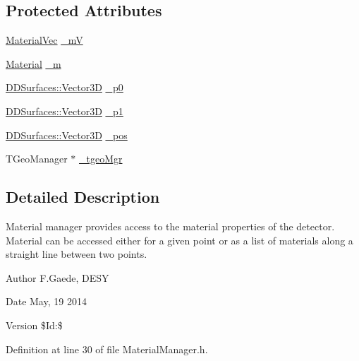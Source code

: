 \subsection*{Protected Attributes}
\begin{DoxyCompactItemize}
\item 
\hyperlink{namespace_d_d4hep_1_1_d_d_rec_a69fdab2f851316d2b9e50956920359f7}{Material\+Vec} \hyperlink{class_d_d4hep_1_1_d_d_rec_1_1_material_manager_ad0ce589d4286c2392a208ec8a09455e4}{\+\_\+mV}
\item 
\hyperlink{class_d_d4hep_1_1_geometry_1_1_material}{Material} \hyperlink{class_d_d4hep_1_1_d_d_rec_1_1_material_manager_a9959722f6a2058c3058c1bc06660f8f1}{\+\_\+m}
\item 
\hyperlink{class_d_d_surfaces_1_1_vector3_d}{D\+D\+Surfaces\+::\+Vector3D} \hyperlink{class_d_d4hep_1_1_d_d_rec_1_1_material_manager_a0d1a1b73cd506aa5a530dc90cf1bd88c}{\+\_\+p0}
\item 
\hyperlink{class_d_d_surfaces_1_1_vector3_d}{D\+D\+Surfaces\+::\+Vector3D} \hyperlink{class_d_d4hep_1_1_d_d_rec_1_1_material_manager_a64db267d786f4371f8cf9ba5d9c805d3}{\+\_\+p1}
\item 
\hyperlink{class_d_d_surfaces_1_1_vector3_d}{D\+D\+Surfaces\+::\+Vector3D} \hyperlink{class_d_d4hep_1_1_d_d_rec_1_1_material_manager_a5ca78ff1887167e4173c1a4767835c6f}{\+\_\+pos}
\item 
T\+Geo\+Manager $\ast$ \hyperlink{class_d_d4hep_1_1_d_d_rec_1_1_material_manager_aa5845dcf0e2d024c17250afa50f3bfb8}{\+\_\+tgeo\+Mgr}
\end{DoxyCompactItemize}


\subsection{Detailed Description}
Material manager provides access to the material properties of the detector. Material can be accessed either for a given point or as a list of materials along a straight line between two points.

\begin{DoxyAuthor}{Author}
F.\+Gaede, D\+E\+SY 
\end{DoxyAuthor}
\begin{DoxyDate}{Date}
May, 19 2014 
\end{DoxyDate}
\begin{DoxyVersion}{Version}
\$\+Id\+:\$ 
\end{DoxyVersion}


Definition at line 30 of file Material\+Manager.\+h.



